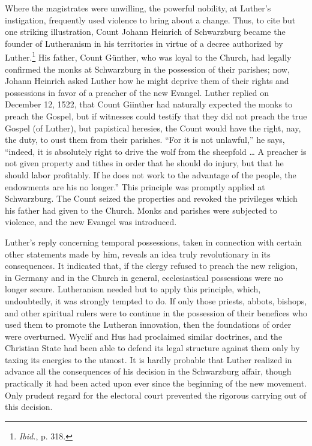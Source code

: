 Where the magistrates were unwilling, the powerful nobility, at
Luther’s instigation, frequently used violence to bring about a change.
Thus, to cite but one striking illustration, Count Johann Heinrich
of Schwarzburg became the founder of Lutheranism in his territories
in virtue of a decree authorized by Luther.\footnote{\textit{Ibid.}, p. 318.}
His father, Count Günther, who was loyal to the Church, had legally confirmed the
monks at Schwarzburg in the possession of their parishes; now, Johann
Heinrich asked Luther how he might deprive them of their rights
and possessions in favor of a preacher of the new Evangel. Luther
replied on December 12, 1522, that Count Giinther had naturally
expected the monks to preach the Gospel, but if witnesses could
testify that they did not preach the true Gospel (of Luther), but
papistical heresies, the Count would have the right, nay, the duty, to
oust them from their parishes. “For it is not unlawful,” he says, “indeed,
it is absolutely right to drive the wolf from the sheepfold \dots
A preacher is not given property and tithes in order that he
should do injury, but that he should labor profitably. If he does not
work to the advantage of the people, the endowments are his no
longer.” This principle was promptly applied at Schwarzburg. The
Count seized the properties and revoked the privileges which his
father had given to the Church. Monks and parishes were subjected
to violence, and the new Evangel was introduced.

Luther’s reply concerning temporal possessions, taken in connection
with certain other statements made by him, reveals an idea truly
revolutionary in its consequences. It indicated that, if the clergy refused
to preach the new religion, in Germany and in the Church in
general, ecclesiastical possessions were no longer secure. Lutheranism
needed but to apply this principle, which, undoubtedly, it was
strongly tempted to do. If only those priests, abbots, bishops, and
other spiritual rulers were to continue in the possession of their benefices
who used them to promote the Lutheran innovation, then the
foundations of order were overturned. Wyclif and Hus had proclaimed similar
doctrines, and the Christian State had been able to defend its legal structure
against them only by taxing its energies to the utmost. It is hardly probable
that Luther realized in advance all the
consequences of his decision in the Schwarzburg affair, though practically
it had been acted upon ever since the beginning of the new
movement. Only prudent regard for the electoral court prevented
the rigorous carrying out of this decision.
